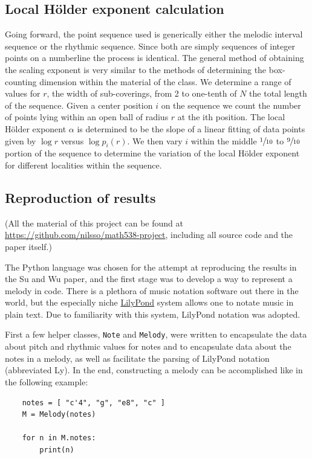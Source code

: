 \documentclass{article}
\begin{document}
\subsection{Local Hölder exponent calculation}

Going forward, the point sequence used is generically either the melodic
interval sequence or the rhythmic sequence. Since both are simply sequences of
integer points on a numberline the process is identical. The general method of
obtaining the scaling exponent is very similar to the methods of determining the
box-counting dimension within the material of the class. We determine a range of
values for $r$, the width of sub-coverings, from 2 to one-tenth of $N$ the total
length of the sequence. Given a center position $i$ on the sequence we count the
number of points lying within an open ball of radius $r$ at the ith position.
The local Hölder exponent $\alpha$ is determined to be the slope of a linear
fitting of data points given by  $\log r$ versus $\log p_i(r)$. We then vary $i$
within the middle $\sfrac{1}{10}$ to $\sfrac{9}{10}$ portion of the sequence to
determine the variation of the local Hölder exponent for different localities
within the sequence.

\subsection{Reproduction of results}

(All the material of this project can be found at
\url{https://github.com/nilsso/math538-project}, including all source code and
the paper itself.)

The Python language was chosen for the attempt at reproducing the results in the
Su and Wu paper, and the first stage was to develop a way to represent a melody
in code. There is a plethora of music notation software out there in the world,
but the especially niche \href{http://lilypond.org/}{LilyPond} system allows one
to notate music in plain text. Due to familiarity with this system, LilyPond
notation was adopted.

First a few helper classes, \verb+Note+ and \verb+Melody+, were written to
encapsulate the data about pitch and rhythmic values for notes and to
encapsulate data about the notes in a melody, as well as facilitate the parsing
of LilyPond notation (abbreviated Ly). In the end, constructing a melody can be
accomplished like in the following example:

\begin{verbatim}
    notes = [ "c'4", "g", "e8", "c" ]
    M = Melody(notes)

    for n in M.notes:
        print(n)
\end{verbatim}
\end{document}
